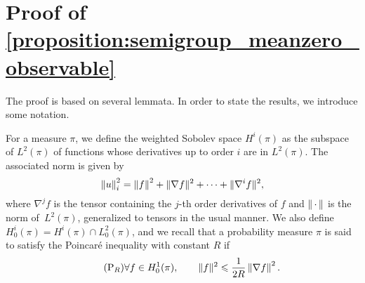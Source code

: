 \documentclass[11pt,a4paper]{article}
\newcommand{\dummy}{\,\cdot\,}
\newcommand{\expect}[0]{\mathbf{E}}
\newcommand{\grad}{\nabla}
\theoremstyle{plain}
\numberwithin{equation}{section}
\renewcommand{\leq}{\leqslant}
\begin{document}
\appendix
\section{Proof of \cref{proposition:semigroup_meanzero_observable}}%
\label{sec:auxiliary_technical_results}

The proof is based on several lemmata.
In order to state the results, we introduce some notation.

For a measure $\pi$, we define the weighted Sobolev space $H^i(\pi)$ as the subspace of $L^2(\pi)$
of functions whose derivatives up to order $i$ are in $L^2(\pi)$.
The associated norm is given by
\[
    \norm{u}_i^2 = \norm{f}^2 + \norm*{\nabla f}^2 + \dotsb + \norm*{\nabla^i f}^2,
\]
where  $\nabla^j f$ is the tensor containing the $j$-th order derivatives of $f$ and $\norm{\dummy}$ is the norm of~$L^2(\pi)$,
generalized to tensors in the usual manner.
We also define $H^{i}_0(\pi) = H^i(\pi) \cap L^2_0(\pi)$,
and we recall that a probability measure $\pi$ is said to satisfy the Poincaré inequality with constant $R$ if
\begin{equation}
    \label{eq:poincare}
    \tag{P$_R$}
    \forall f \in H^1_0(\pi), \qquad
    \norm*{f}^2 \leq \frac{1}{2R} \norm{\grad f}^2.
\end{equation}
\end{document}

